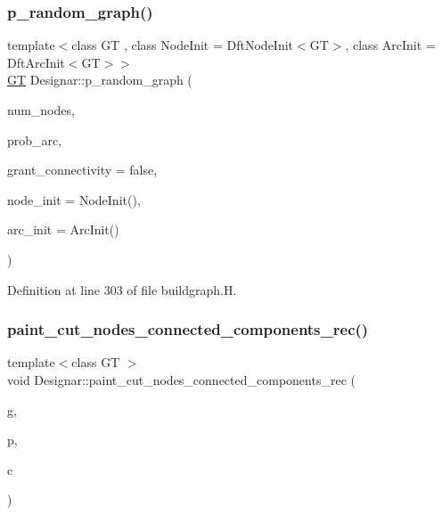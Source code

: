 \subsubsection{\texorpdfstring{p\+\_\+random\+\_\+graph()}{p\_random\_graph()}\hspace{0.1cm}{\footnotesize\ttfamily [2/2]}}
{\footnotesize\ttfamily template$<$class GT , class Node\+Init  = Dft\+Node\+Init$<$\+G\+T$>$, class Arc\+Init  = Dft\+Arc\+Init$<$\+G\+T$>$$>$ \\
\hyperlink{demo-buildgraph_8_c_a3001c40d2c31ca87ed96cd7d1334a55e}{GT} Designar\+::p\+\_\+random\+\_\+graph (\begin{DoxyParamCaption}\item[{\hyperlink{namespace_designar_aa72662848b9f4815e7bf31a7cf3e33d1}{nat\+\_\+t}}]{num\+\_\+nodes,  }\item[{\hyperlink{namespace_designar_aca2c32af26808dbec1f3a3071fad25ce}{real\+\_\+t}}]{prob\+\_\+arc,  }\item[{bool}]{grant\+\_\+connectivity = {\ttfamily false},  }\item[{Node\+Init \&\&}]{node\+\_\+init = {\ttfamily NodeInit()},  }\item[{Arc\+Init \&\&}]{arc\+\_\+init = {\ttfamily ArcInit()} }\end{DoxyParamCaption})}



Definition at line 303 of file buildgraph.\+H.

\mbox{\label{namespace_designar_aba19bd6f648fd502d1dcbcc37d1edfda}} 
\subsubsection{\texorpdfstring{paint\+\_\+cut\+\_\+nodes\+\_\+connected\+\_\+components\+\_\+rec()}{paint\_cut\_nodes\_connected\_components\_rec()}}
{\footnotesize\ttfamily template$<$class GT $>$ \\
void Designar\+::paint\+\_\+cut\+\_\+nodes\+\_\+connected\+\_\+components\+\_\+rec (\begin{DoxyParamCaption}\item[{\hyperlink{demo-buildgraph_8_c_a3001c40d2c31ca87ed96cd7d1334a55e}{GT} \&}]{g,  }\item[{\hyperlink{namespace_designar_a5af326c65aa2bd26b26c410f2030d09e}{Node}$<$ \hyperlink{demo-buildgraph_8_c_a3001c40d2c31ca87ed96cd7d1334a55e}{GT} $>$ \&}]{p,  }\item[{\hyperlink{namespace_designar_a9d113d66a39e82b73727c72cd3a52f73}{lint\+\_\+t}}]{c }\end{DoxyParamCaption})}



